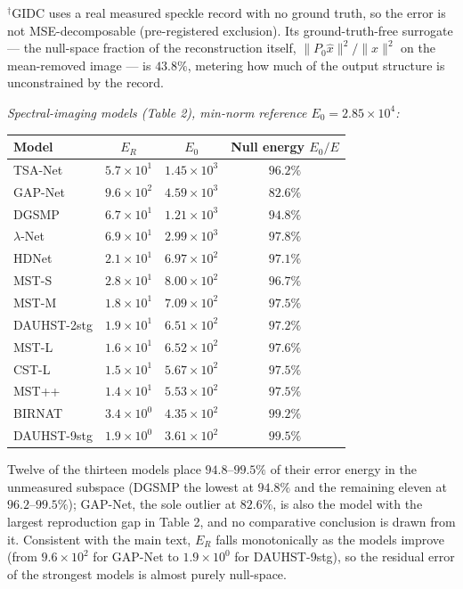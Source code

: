 \documentclass[11pt]{article}
\begin{document}
$^{\dagger}$GIDC uses a real measured speckle record with no ground truth, so the error is not MSE-decomposable (pre-registered exclusion). Its ground-truth-free surrogate --- the null-space fraction of the reconstruction itself, $\|P_0\hat{x}\|^2/\|\hat{x}\|^2$ on the mean-removed image --- is $43.8\%$, metering how much of the output structure is unconstrained by the record.

\textit{Spectral-imaging models (Table 2), min-norm reference $E_0 = 2.85\times10^{4}$:}

\begin{center}\begin{tabular}{lccc}
\toprule
Model & $E_R$ & $E_0$ & Null energy $E_0/E$ \\
\midrule
TSA-Net & $5.7\times10^{1}$ & $1.45\times10^{3}$ & $96.2\%$ \\
GAP-Net & $9.6\times10^{2}$ & $4.59\times10^{3}$ & $82.6\%$ \\
DGSMP & $6.7\times10^{1}$ & $1.21\times10^{3}$ & $94.8\%$ \\
$\lambda$-Net & $6.9\times10^{1}$ & $2.99\times10^{3}$ & $97.8\%$ \\
HDNet & $2.1\times10^{1}$ & $6.97\times10^{2}$ & $97.1\%$ \\
MST-S & $2.8\times10^{1}$ & $8.00\times10^{2}$ & $96.7\%$ \\
MST-M & $1.8\times10^{1}$ & $7.09\times10^{2}$ & $97.5\%$ \\
DAUHST-2stg & $1.9\times10^{1}$ & $6.51\times10^{2}$ & $97.2\%$ \\
MST-L & $1.6\times10^{1}$ & $6.52\times10^{2}$ & $97.6\%$ \\
CST-L & $1.5\times10^{1}$ & $5.67\times10^{2}$ & $97.5\%$ \\
MST++ & $1.4\times10^{1}$ & $5.53\times10^{2}$ & $97.5\%$ \\
BIRNAT & $3.4\times10^{0}$ & $4.35\times10^{2}$ & $99.2\%$ \\
DAUHST-9stg & $1.9\times10^{0}$ & $3.61\times10^{2}$ & $99.5\%$ \\
\bottomrule
\end{tabular}\end{center}

Twelve of the thirteen models place $94.8$--$99.5\%$ of their error energy in the unmeasured subspace (DGSMP the lowest at $94.8\%$ and the remaining eleven at $96.2$--$99.5\%$); GAP-Net, the sole outlier at $82.6\%$, is also the model with the largest reproduction gap in Table 2, and no comparative conclusion is drawn from it. Consistent with the main text, $E_R$ falls monotonically as the models improve (from $9.6\times10^{2}$ for GAP-Net to $1.9\times10^{0}$ for DAUHST-9stg), so the residual error of the strongest models is almost purely null-space.
\end{document}
